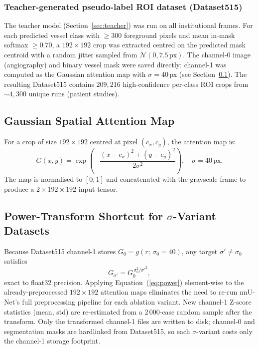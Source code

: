\documentclass[12pt]{article}
\begin{document}
\subsubsection{Teacher-generated pseudo-label ROI dataset (Dataset515)}

The teacher model (Section~\ref{sec:teacher}) was run on all institutional
frames. For each predicted vessel class with $\geq300$ foreground pixels and
mean in-mask softmax $\geq0.70$, a $192\times192$ crop was extracted centred
on the predicted mask centroid with a random jitter sampled from
$\mathcal{N}(0, 7.5\,\text{px})$. The channel-0 image (angiography) and binary
vessel mask were saved directly; channel-1 was computed as the Gaussian
attention map with $\sigma{=}40$\,px (see Section~\ref{sec:gauss}). The
resulting Dataset515 contains $209{,}216$ high-confidence per-class ROI crops
from ${\sim}4{,}300$ unique runs (patient studies).

\subsection{Gaussian Spatial Attention Map}
\label{sec:gauss}

For a crop of size $192\times192$ centred at pixel $(c_x, c_y)$, the attention
map is:
\begin{equation}
G(x, y) = \exp\!\left(-\frac{(x-c_x)^2+(y-c_y)^2}{2\sigma^2}\right),
\quad \sigma = 40\,\text{px}.
\label{eq:gauss}
\end{equation}
The map is normalised to $[0,1]$ and concatenated with the grayscale frame to
produce a $2\times192\times192$ input tensor.

\subsection{Power-Transform Shortcut for $\sigma$-Variant Datasets}
\label{sec:power}

Because Dataset515 channel-1 stores $G_0 = g(r;\,\sigma_0{=}40)$, any target
$\sigma' \neq \sigma_0$ satisfies
\begin{equation}
G_{\sigma'} = G_0^{\,\sigma_0^2/\sigma'^2},
\label{eq:power}
\end{equation}
exact to float32 precision. Applying Equation~(\ref{eq:power})
element-wise to the already-preprocessed $192\times192$ attention maps
eliminates the need to re-run nnU-Net's full preprocessing pipeline for each
ablation variant.  New channel-1 Z-score statistics (mean, std) are re-estimated
from a 2\,000-case random sample after the transform. Only the transformed
channel-1 files are written to disk; channel-0 and segmentation masks are
hardlinked from Dataset515, so each $\sigma$-variant costs only the channel-1
storage footprint.
\end{document}
